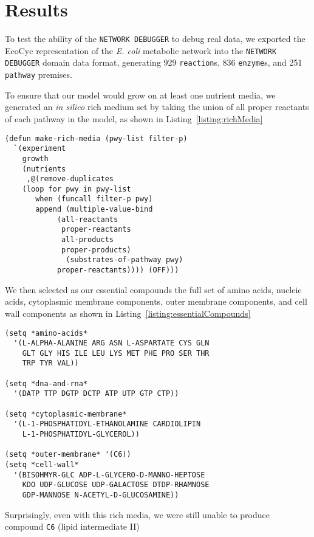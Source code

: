\section{Results} 
To test the ability of the {\tt NETWORK DEBUGGER} to debug real data, we
exported the EcoCyc\cite{ecocyc}\cite{romero2001} representation of the {\em E. coli}
metabolic network into the {\tt NETWORK DEBUGGER} domain data format, generating
929 {\tt reaction}s, 836 {\tt enzyme}s, and 251 {\tt pathway} premises.

To ensure that our model would grow on at least one nutrient media, we generated an {\em in silico} rich medium
set by taking the union of all proper reactants of each pathway in the model, as shown in Listing~\ref{listing:richMedia}

\begin{lstlisting}[label={listing:richMedia},caption={{\em E. coli} rich media}]
(defun make-rich-media (pwy-list filter-p)
  `(experiment 
    growth 
    (nutrients 
     ,@(remove-duplicates 
	(loop for pwy in pwy-list
	   when (funcall filter-p pwy)
	   append (multiple-value-bind
			(all-reactants 
			 proper-reactants 
			 all-products 
			 proper-products)
		      (substrates-of-pathway pwy)
		    proper-reactants)))) (OFF)))
\end{lstlisting}

We then selected as our essential compounds the full set of amino acids, nucleic acids, cytoplasmic membrane components,
outer membrane components, and cell wall components as shown in Listing~\ref{listing:essentialCompounds}

\begin{lstlisting}[label={listing:essentialCompounds},caption={{\em E. coli} essential compounds}]
(setq *amino-acids*
  '(L-ALPHA-ALANINE ARG ASN L-ASPARTATE CYS GLN 
    GLT GLY HIS ILE LEU LYS MET PHE PRO SER THR 
    TRP TYR VAL))

(setq *dna-and-rna*
  '(DATP TTP DGTP DCTP ATP UTP GTP CTP))

(setq *cytoplasmic-membrane*
  '(L-1-PHOSPHATIDYL-ETHANOLAMINE CARDIOLIPIN 
    L-1-PHOSPHATIDYL-GLYCEROL))

(setq *outer-membrane* '(C6))
(setq *cell-wall*
  '(BISOHMYR-GLC ADP-L-GLYCERO-D-MANNO-HEPTOSE 
    KDO UDP-GLUCOSE UDP-GALACTOSE DTDP-RHAMNOSE 
    GDP-MANNOSE N-ACETYL-D-GLUCOSAMINE))
\end{lstlisting}

Surprisingly, even with this rich media, we were still unable to produce compound {\tt C6} (lipid intermediate II)

